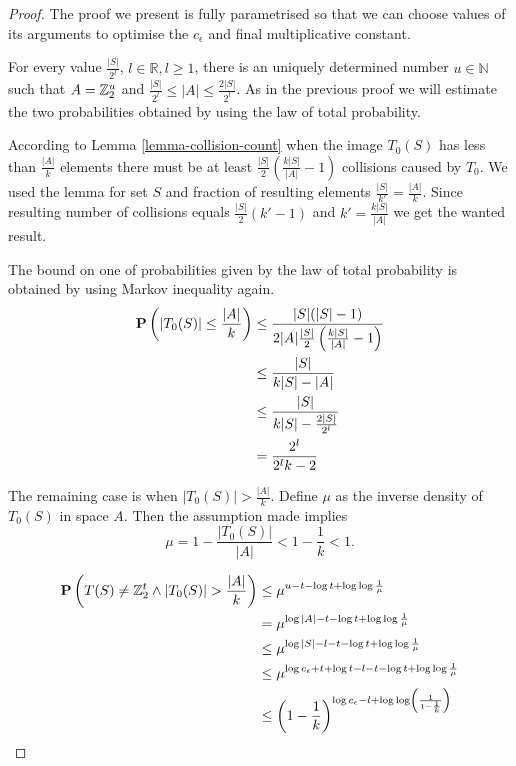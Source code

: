 \begin{proof}
The proof we present is fully parametrised so that we can choose values of its arguments to optimise the $c_\epsilon$ and final multiplicative constant.

For every value $\frac{|S|}{2^l}$, $l \in \mathbb{R}, l \geq 1$, there is an uniquely determined number $u \in \mathbb{N}$ such that $A = \mathbb{Z}_{2}^{u}$ and $\frac{|S|}{2 ^ l} \leq |A| \leq \frac{2|S|}{2 ^ l}$. As in the previous proof we will estimate the two probabilities obtained by using the law of total probability.

According to Lemma \ref{lemma-collision-count} when the image $T_0(S)$ has less than $\frac{|A|}{k}$ elements there must be at least $\frac{|S|}{2}\left(\frac{k|S|}{|A|} - 1\right)$ collisions caused by $T_0$. We used the lemma for set $S$ and fraction of resulting elements $\frac{|S|}{k'} = \frac{|A|}{k}$. Since resulting number of collisions equals $\frac{|S|}{2}(k' - 1)$ and $k' = \frac{k|S|}{|A|}$ we get the wanted result.

The bound on one of probabilities given by the law of total probability is obtained by using Markov inequality again.
\[
\begin{split}
\mathbf{P}\left(|T_0(S)| \leq \frac{|A|}{k}\right) 
	& \leq \frac{|S|(|S| - 1)}{2|A|\frac{|S|}{2}\left(\frac{k|S|}{|A|} - 1\right)} \\
	& \leq \frac{|S|}{k|S| - |A|} \\
	& \leq \frac{|S|}{k|S| - \frac{2|S|}{2^l}} \\ 
	& = \frac{2^l}{2^l k - 2} \\
\end{split}
\]

The remaining case is when $|T_0(S)| > \frac {|A|}{k}$. Define $\mu$ as the inverse density of $T_0(S)$ in space $A$. Then the assumption made implies
\[
	\mu = 1 - \frac{|T_0(S)|}{|A|} < 1 - \frac{1}{k} < 1 \text{.}
\]

\[
\begin{split}
\mathbf{P}\left(T(S) \neq \mathbb{Z}_{2}^{t} \wedge |T_0(S)| > \frac {|A|}{k}\right) 
	& \leq \mu ^ {u - t - \log t + \log \log \frac{1}{\mu}} \\ 
	& = \mu ^ {\log |A| - t - \log t + \log \log \frac{1}{\mu}} \\ 
	& \leq \mu ^ {\log |S| - l - t - \log t + \log \log \frac{1}{\mu}} \\ 
	& \leq \mu ^ {\log c_\epsilon + t + \log t - l - t - \log t + \log \log \frac{1}{\mu}} \\ 
	& \leq \left(1 - \frac{1}{k}\right) ^ {\log c_\epsilon - l + \log \log \left(\frac{1}{1 - \frac{1}{k}} \right)}
\end{split}
\]


\end{proof}
